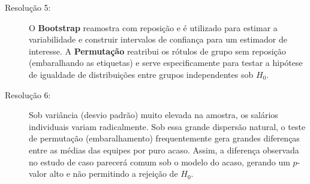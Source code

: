 \documentclass[12pt]{article}
\begin{document}
\begin{description}
    \item[Resolução 5:] O \textbf{Bootstrap} reamostra com reposição e é utilizado para estimar a variabilidade e construir intervalos de confiança para um estimador de interesse. A \textbf{Permutação} reatribui os rótulos de grupo sem reposição (embaralhando as etiquetas) e serve especificamente para testar a hipótese de igualdade de distribuições entre grupos independentes sob $H_0$.

    \item[Resolução 6:] Sob variância (desvio padrão) muito elevada na amostra, os salários individuais variam radicalmente. Sob essa grande dispersão natural, o teste de permutação (embaralhamento) frequentemente gera grandes diferenças entre as médias das equipes por puro acaso. Assim, a diferença observada no estudo de caso parecerá comum sob o modelo do acaso, gerando um $p$-valor alto e não permitindo a rejeição de $H_0$.
\end{description}
\end{document}
